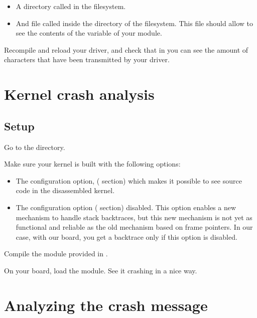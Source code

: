 \begin{itemize}

\item A directory called  in the  filesystem.

\item And file called  inside the 
  directory of the  filesystem. This file should allow to see
  the contents of the  variable of your module.

\end{itemize}

Recompile and reload your driver, and check that in
 you can see the amount of characters
that have been transmitted by your driver.

\section{Kernel crash analysis}

\subsection{Setup}

Go to the  directory.

Make sure your kernel is built with the following options:

\begin{itemize}

\item The  configuration option,
  ( section) which makes it possible to see source
  code in the disassembled kernel.

\item The  configuration option
  ( section) disabled. This option enables a
  new mechanism to handle stack backtraces, but this new mechanism is
  not yet as functional and reliable as the old mechanism based on frame
  pointers. In our case, with our board, you get a backtrace only if
  this option is disabled.
\end{itemize}

Compile the  module provided in .

On your board, load the  module. See it crashing
in a nice way.

\section{Analyzing the crash message}

